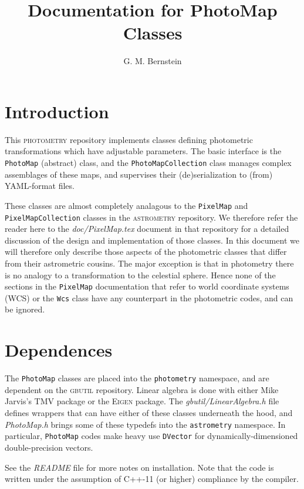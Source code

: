 \documentclass[11pt,preprint,flushrt]{aastex}
\begin{document}

\title{Documentation for PhotoMap Classes}

\author{G. M. Bernstein}

\section{Introduction}
This \textsc{photometry} repository implements classes defining photometric transformations which have adjustable parameters.  The basic interface is the {\tt PhotoMap} (abstract) class, and the \texttt{PhotoMapCollection} class manages complex assemblages of these maps, and supervises their (de)serialization to (from) YAML-format files.

These classes are almost completely analagous to the \texttt{PixelMap} and \texttt{PixelMapCollection} classes in the \textsc{astrometry} repository.  We therefore refer the reader here to the \textit{doc/PixelMap.tex} document in that repository for a detailed discussion of the design and implementation of those classes.  In this document we will therefore only describe those aspects of the photometric classes that differ from their astrometric cousins.  The major exception is that in photometry there is no analogy to a transformation to the celestial sphere.  Hence none of the sections in the \texttt{PixelMap} documentation that refer to world coordinate systems (WCS) or the \texttt{Wcs} class have any counterpart in the photometric codes, and can be ignored.

\section{Dependences}
The {\tt PhotoMap} classes are placed into the \texttt{photometry} namespace, and are dependent on the \textsc{gbutil} repository.
Linear algebra is done with either Mike Jarvis's {\sc TMV} package or the \textsc{Eigen} package.  The \textit{gbutil/LinearAlgebra.h} file defines wrappers that can have either of these classes underneath the hood, and {\it PhotoMap.h} brings some of these typedefs into the \texttt{astrometry} namespace.  In particular, \texttt{PhotoMap} codes make heavy use {\tt DVector} for dynamically-dimensioned double-precision vectors. 

See the \textit{README} file for more notes on installation.  Note that the code is written under the assumption of C++-11 (or higher) compliance by the compiler.
\end{document}
